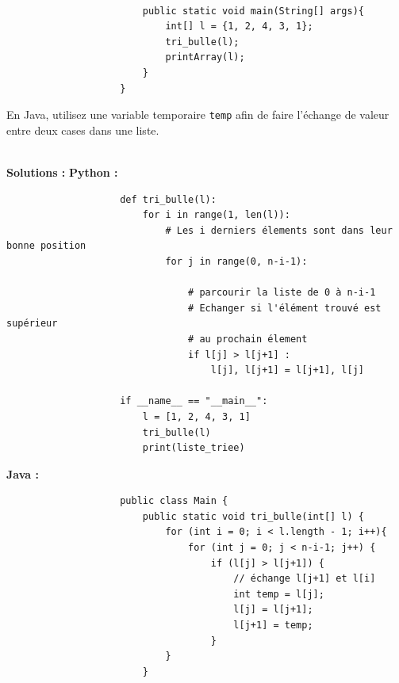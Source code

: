 \begin{Exercice} [20 minutes]
\begin{itemize}
\begin{verbatim}
                        
                        public static void main(String[] args){
                            int[] l = {1, 2, 4, 3, 1};
                            tri_bulle(l);
                            printArray(l);
                        }
                    }
                \end{verbatim}
    \end{itemize}
    
    \begin{conseil}
    En Java, utilisez une variable temporaire \lstinline{temp} afin de faire l'échange de valeur entre deux cases dans une liste.
    \end{conseil}
    
    \ \\
    
    \textbf{Solutions :}
    \textbf{Python :}
                \begin{verbatim}
                    def tri_bulle(l):
                        for i in range(1, len(l)):
                            # Les i derniers élements sont dans leur bonne position 
                            for j in range(0, n-i-1): 
                      
                                # parcourir la liste de 0 à n-i-1 
                                # Echanger si l'élément trouvé est supérieur 
                                # au prochain élement
                                if l[j] > l[j+1] : 
                                    l[j], l[j+1] = l[j+1], l[j] 
                    
                    if __name__ == "__main__":
                        l = [1, 2, 4, 3, 1]
                        tri_bulle(l)
                        print(liste_triee)
                \end{verbatim}
        \textbf{Java :}
                \begin{verbatim}
                    public class Main {
                        public static void tri_bulle(int[] l) {
                            for (int i = 0; i < l.length - 1; i++){
                                for (int j = 0; j < n-i-1; j++) {
                                    if (l[j] > l[j+1]) { 
                                        // échange l[j+1] et l[i] 
                                        int temp = l[j]; 
                                        l[j] = l[j+1]; 
                                        l[j+1] = temp; 
                                    } 
                            }
                        }
                        

\end{verbatim}
\end{Exercice}
